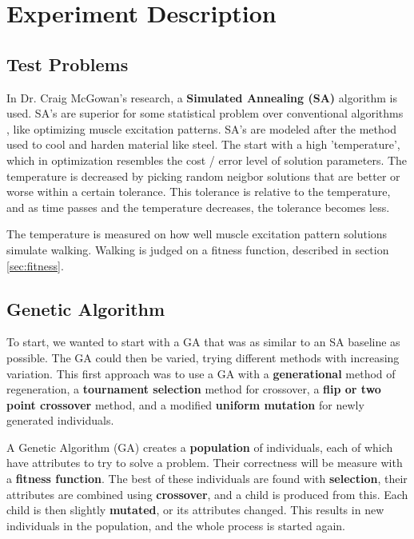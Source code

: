 \section{Experiment Description}

\subsection{Test Problems}
In Dr. Craig McGowan's research, a \textbf{Simulated Annealing (SA)} algorithm
is used. SA's are superior for some statistical problem over conventional 
algorithms \cite{goffe-sa}, like optimizing muscle excitation patterns. 
SA's are modeled after the method used to cool and
harden material like steel.
The start with a high 'temperature', which in optimization resembles the cost / 
error level of solution parameters. The temperature is decreased by picking 
random neigbor solutions that are better or worse within a certain tolerance.
This tolerance is relative to the temperature, and as time passes and the 
temperature decreases, the tolerance becomes less.

The temperature is measured on how well muscle excitation pattern solutions
simulate walking. Walking is judged on a fitness function, described in 
section \ref{sec:fitness}.

\subsection{Genetic Algorithm}
To start, we wanted to start with a GA that was as similar to an SA baseline 
as possible. The GA could then be varied, trying different methods with 
increasing variation. This first approach was to use a GA with a 
\textbf{generational} method of regeneration, a \textbf{tournament selection} 
method for crossover, a \textbf{flip or two point crossover} method, and a 
modified 
\textbf{uniform mutation} for newly generated individuals.

A Genetic Algorithm (GA) creates a \textbf{population} of individuals, each of which have attributes to try to solve a problem. Their correctness will be measure with a \textbf{fitness function}. The best of these individuals are found with \textbf{selection}, their attributes are combined using \textbf{crossover}, and a child is produced from this. Each child is then slightly \textbf{mutated}, or its attributes changed. This results in new individuals in the population, and the whole process is started again.

